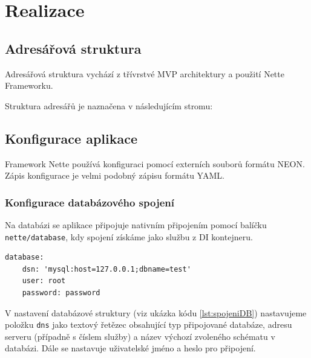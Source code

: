\documentclass[czech,BP]{thesiskiv}
\begin{document}
\chapter{Realizace}
	\section{Adresářová struktura}
	\par Adresářová struktura vychází z třívrstvé MVP architektury a  použití Nette Frameworku.
	\par Struktura adresářů je naznačena v následujícím stromu:
	\section{Konfigurace aplikace}
	\par Framework Nette používá konfiguraci pomocí externích souborů formátu NEON. Zápis konfigurace je velmi podobný zápisu formátu YAML.
	\subsection{Konfigurace databázového spojení}
	\par Na databázi se aplikace připojuje nativním připojením pomocí balíčku \texttt{nette/database}, kdy spojení získáme jako službu z DI kontejneru.
	\begin{lstlisting}[caption={Konfigurace databázového spojení},label={lst:spojeniDB}]
database:
	dsn: 'mysql:host=127.0.0.1;dbname=test'
	user: root
	password: password
\end{lstlisting}
	\par V nastavení databázové struktury (viz ukázka kódu \ref{lst:spojeniDB}) nastavujeme položku \texttt{dns} jako textový řetězec obsahující typ připojované databáze, adresu serveru (případně s číslem služby) a název výchozí zvoleného schématu v databázi. Dále se nastavuje uživatelské jméno a heslo pro připojení.
\end{document}
